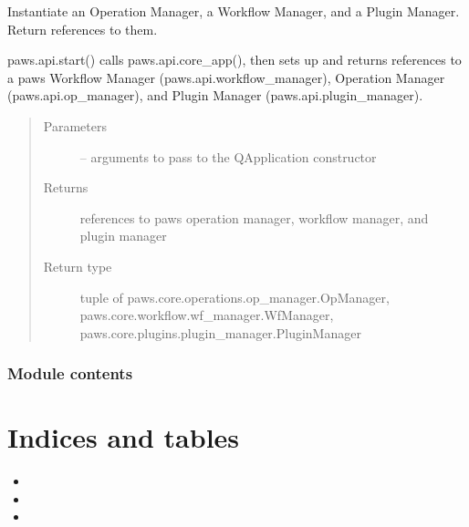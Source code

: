\documentclass[letterpaper,10pt,english]{sphinxmanual}
\begin{document}

\begin{fulllineitems}
\label{\detokenize{apidoc_files/paws.api:paws.api.start}}
Instantiate an Operation Manager, a Workflow Manager, and a Plugin Manager. Return references to them.

paws.api.start() calls paws.api.core\_app(),
then sets up and returns references to 
a paws Workflow Manager (paws.api.workflow\_manager),
Operation Manager (paws.api.op\_manager),
and Plugin Manager (paws.api.plugin\_manager).
\begin{quote}\begin{description}
\item[{Parameters}] \leavevmode
{} -- arguments to pass to the QApplication constructor

\item[{Returns}] \leavevmode
references to paws operation manager, workflow manager, and plugin manager

\item[{Return type}] \leavevmode
tuple of paws.core.operations.op\_manager.OpManager, paws.core.workflow.wf\_manager.WfManager, paws.core.plugins.plugin\_manager.PluginManager

\end{description}\end{quote}

\end{fulllineitems}



\subsection{Module contents}
\label{\detokenize{apidoc_files/paws:module-paws}}\label{\detokenize{apidoc_files/paws:module-contents}}

\chapter{Indices and tables}
\label{\detokenize{index:indices-and-tables}}\begin{itemize}
\item {} 

\item {} 

\item {} 

\end{itemize}
\end{document}
